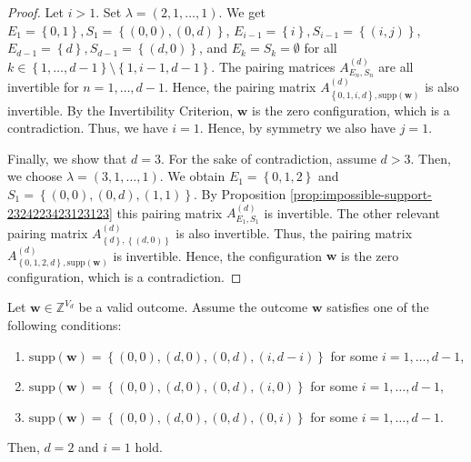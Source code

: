 \begin{proof}
    Let \( i > 1 \). Set \( \lambda = (2,1, \dots, 1) \). We get \( E_1 = \left\{ 0,1 \right\}, S_1 = \left\{ (0,0), (0,d) \right\} \), \( E_{i-1} = \left\{ i \right\}, S_{i-1} = \left\{ (i,j) \right\}\), \( E_{d-1} = \left\{ d \right\}, S_{d-1} = \left\{ (d,0) \right\} \), and \( E_k = S_k = \emptyset \) for all \( k \in \left\{ 1, \dots, d-1 \right\} \setminus \left\{ 1, i-1, d-1 \right\} \). The pairing matrices \( A^{(d)}_{E_n, S_n} \) are all invertible for \( n = 1, \dots, d-1 \). Hence, the pairing matrix \( A^{(d)}_{\left\{ 0,1,i,d \right\}, \mathrm{supp}(\mathbf{w})} \) is also invertible. By the Invertibility Criterion, \( \mathbf{w} \) is the zero configuration, which is a contradiction. Thus, we have \( i = 1 \). Hence, by symmetry we also have \( j = 1 \).

    Finally, we show that \( d = 3 \). For the sake of contradiction, assume \( d > 3 \). Then, we choose \( \lambda = (3,1,\dots, 1) \). We obtain \( E_1 = \left\{ 0,1,2 \right\} \) and \( S_1 = \left\{ (0,0), (0,d), (1,1) \right\} \). By Proposition \ref{prop:impossible-support-2324223423123123} this pairing matrix \( A^{(d)}_{E_1, S_1} \) is invertible. The other relevant pairing matrix \( A^{(d)}_{\left\{ d \right\}, \left\{ (d,0) \right\}} \) is also invertible. Thus, the pairing matrix \( A^{(d)}_{\left\{ 0,1,2,d \right\}, \mathrm{supp}(\mathbf{w})} \) is invertible. Hence, the configuration \( \mathbf{w} \) is the zero configuration, which is a contradiction.
\end{proof}

\begin{proposition}\label{prop:symmetry-34234324}
    Let \( \mathbf{w} \in \mathbb{Z}^{V_d} \) be a valid outcome. Assume the outcome \( \mathbf{w} \) satisfies one of the following conditions:
    \begin{enumerate}
        \item \( \mathrm{supp}(\mathbf{w}) = \left\{ (0,0), (d,0), (0,d), (i,d-i) \right\} \) for some \( i = 1, \dots, d-1 \),
        \item \(\mathrm{supp}(\mathbf{w}) = \left\{ (0,0), (d,0), (0,d), (i,0) \right\} \) for some \( i = 1, \dots, d-1 \),
        \item \( \mathrm{supp}(\mathbf{w}) = \left\{ (0,0), (d,0), (0,d), (0,i) \right\} \) for some \( i = 1, \dots, d-1 \).
    \end{enumerate}
    Then, \( d = 2 \) and \( i = 1 \) hold.
\end{proposition}


